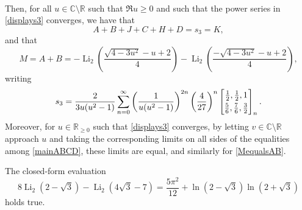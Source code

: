 \documentclass[10pt,a4paper]{amsart}
\begin{document}
\begin{theorem}
\begin{align*}
\end{align*} 
 Then, for all $u \in \mathbb{C} \setminus \mathbb{R}$ such that $\Re u \geq 0$ and such that the power series 
 in \eqref{displays3} converges, we have that 
\begin{equation}\label{mainABCD}
 A + B + J + C + H + D = s_3 = K, 
\end{equation}
 and that 
\begin{equation}\label{MequalsAB}
 M = A + B = 
 - \operatorname{Li}_{2}\left( \frac{\sqrt{4 - 3 u^2} - u + 2}{4} \right) 
 - \operatorname{Li}_{2}\left( \frac{-\sqrt{4 - 3 u^2} - u + 2}{4} \right), 
\end{equation}
 writing 
\begin{equation}\label{displays3}
 s_3 = \frac{2}{3u(u^2-1)} \sum_{n=0}^{\infty} \left( \frac{1}{u(u^2-1)} \right)^{2n} \left( \frac{4}{27} \right)^{n} 
 \left[ \begin{matrix} \frac{1}{2}, \frac{1}{2}, 1 
 \vspace{1mm} \\ 
 \frac{5}{6}, \frac{7}{6}, \frac{3}{2} \end{matrix} \right]_{n}. 
\end{equation}
 Moreover, for $u \in \mathbb{R}_{\geq 0}$ such that \eqref{displays3} converges, by letting $v \in \mathbb{C} \setminus \mathbb{R}$ 
 approach $u$ and taking the corresponding limits on all sides of the equalities among \eqref{mainABCD}, these limits are equal, 
 and similarly for \eqref{MequalsAB}. 
\end{theorem}

\begin{theorem}\label{theoremSunCampbell}
 The closed-form evaluation
 $$ 8 \operatorname{Li}_2\left(2-\sqrt{3}\right)-\operatorname{Li}_2\left(4 \sqrt{3} - 7 \right) 
 = \frac{5 \pi ^2}{12}+\ln \left(2-\sqrt{3}\right) \ln \left(2+\sqrt{3}\right) $$
 holds true.
\end{theorem}
\end{document}
